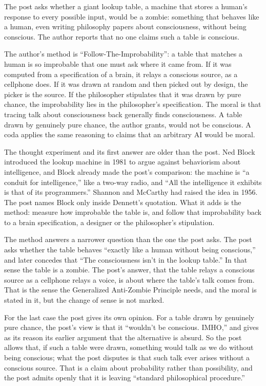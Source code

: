 \begin{afterword}
\summaryhead

The post asks whether a giant lookup table, a machine that stores a human's response to every possible input, would be a zombie: something that behaves like a human, even writing philosophy papers about consciousness, without being conscious. The author reports that no one claims such a table is conscious.

The author's method is ``Follow-The-Improbability'': a table that matches a human is so improbable that one must ask where it came from. If it was computed from a specification of a brain, it relays a conscious source, as a cellphone does. If it was drawn at random and then picked out by design, the picker is the source. If the philosopher stipulates that it was drawn by pure chance, the improbability lies in the philosopher's specification. The moral is that tracing talk about consciousness back generally finds consciousness. A table drawn by genuinely pure chance, the author grants, would not be conscious. A coda applies the same reasoning to claims that an arbitrary AI would be moral.

\responsehead

The thought experiment and its first answer are older than the post. Ned Block introduced the lookup machine in 1981 to argue against behaviorism about intelligence, and Block already made the post's comparison: the machine is ``a conduit for intelligence,'' like a two-way radio, and ``All the intelligence it exhibits is that of its programmers.'' Shannon and McCarthy had raised the idea in 1956. The post names Block only inside Dennett's quotation. What it adds is the method: measure how improbable the table is, and follow that improbability back to a brain specification, a designer or the philosopher's stipulation.

The method answers a narrower question than the one the post asks. The post asks whether the table behaves ``exactly like a human without being conscious,'' and later concedes that ``The consciousness isn't in the lookup table.'' In that sense the table is a zombie. The post's answer, that the table relays a conscious source as a cellphone relays a voice, is about where the table's talk comes from. That is the sense the Generalized Anti-Zombie Principle needs, and the moral is stated in it, but the change of sense is not marked.

For the last case the post gives its own opinion. For a table drawn by genuinely pure chance, the post's view is that it ``wouldn't be conscious. IMHO,'' and gives as its reason its earlier argument that the alternative is absurd. So the post allows that, if such a table were drawn, something would talk as we do without being conscious; what the post disputes is that such talk ever arises without a conscious source. That is a claim about probability rather than possibility, and the post admits openly that it is leaving ``standard philosophical procedure.''


\end{afterword}
